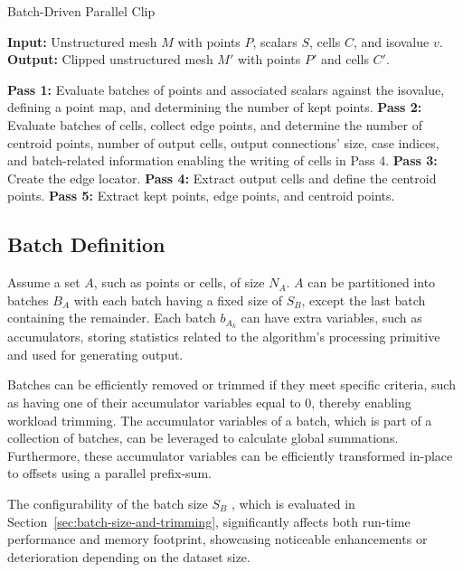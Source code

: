\documentclass{egpubl}
\begin{document}
\begin{algorithm}
\caption{Batch-Driven Parallel Clip}
\label{alg:par-iso}
\raggedright
\textbf{Input:} Unstructured mesh $M$ with points $P$, scalars $S$, cells $C$, and isovalue $v$.\\
\textbf{Output:} Clipped unstructured mesh $M'$ with points $P'$ and cells $C'$.
\begin{algorithmic}[1]
    \State \textbf{Pass 1:} Evaluate batches of points and associated scalars against the isovalue, defining a point map, and determining the number of kept points.
    \State \textbf{Pass 2:} Evaluate batches of cells, collect edge points, and determine the number of centroid points, number of output cells, output connections' size, case indices, and batch-related information enabling the writing of cells in Pass 4.
    \State \textbf{Pass 3:} Create the edge locator.
    \State \textbf{Pass 4:} Extract output cells and define the centroid points.
    \State \textbf{Pass 5:} Extract kept points, edge points, and centroid points.
\end{algorithmic}
\end{algorithm}

\subsection{Batch Definition}

Assume a set $A$, such as points or cells, of size $N_A$. $A$ can be partitioned into batches $B_A$ with each batch having a fixed size of $S_B$, except the last batch containing the remainder. Each batch $b_{A_k}$ can have extra variables, such as accumulators, storing statistics related to the algorithm's processing primitive and used for generating output.

Batches can be efficiently removed or trimmed if they meet specific criteria, such as having one of their accumulator variables equal to $0$, thereby enabling workload trimming. The accumulator variables of a batch, which is part of a collection of batches, can be leveraged to calculate global summations. Furthermore, these accumulator variables can be efficiently transformed in-place to offsets using a parallel prefix-sum.

The configurability of the batch size $S_B$
, which is evaluated in Section~\ref{sec:batch-size-and-trimming}, 
significantly affects both run-time performance and memory footprint, showcasing noticeable enhancements or deterioration depending on the dataset size.
\end{document}
